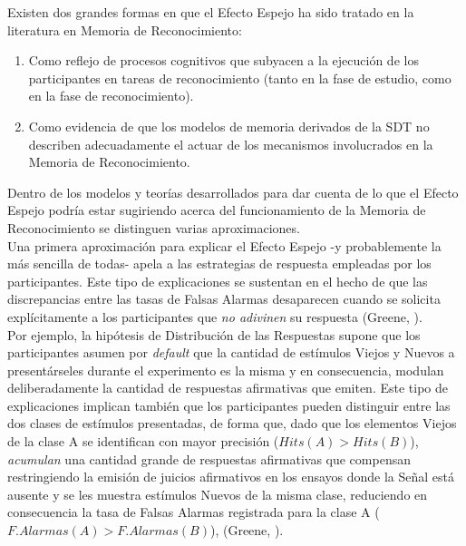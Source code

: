 Existen dos grandes formas en que el Efecto Espejo ha sido tratado en la literatura en Memoria de Reconocimiento:\\

\begin{enumerate}
\item Como reflejo de procesos cognitivos que subyacen a la ejecución de los participantes en tareas de reconocimiento (tanto en la fase de estudio, como en la fase de reconocimiento).\\

\item Como evidencia de que los modelos de memoria derivados de la SDT no describen adecuadamente el actuar de los mecanismos involucrados en la Memoria de Reconocimiento.\\
\end{enumerate}

Dentro de los modelos y teorías desarrollados para dar cuenta de lo que el Efecto Espejo podría estar sugiriendo acerca del funcionamiento de la Memoria de Reconocimiento se distinguen varias aproximaciones.\\

Una primera aproximación para explicar el Efecto Espejo -y probablemente la más sencilla de todas- apela a las estrategias de respuesta empleadas por los participantes. Este tipo de explicaciones se sustentan en el hecho de que las discrepancias entre las tasas de Falsas Alarmas desaparecen cuando se solicita explícitamente a los participantes que \textit{no adivinen} su respuesta (Greene, \citeyear{Greene1996}).\\

Por ejemplo, la hipótesis de Distribución de las Respuestas supone que los participantes asumen por \textit{default} que la cantidad de estímulos Viejos y Nuevos a presentárseles durante el experimento es la misma y en consecuencia, modulan deliberadamente la cantidad de respuestas afirmativas que emiten. Este tipo de explicaciones implican también que los participantes pueden distinguir entre las dos clases de estímulos presentadas, de forma que, dado que los elementos Viejos de la clase A se identifican con mayor precisión ($Hits(A) > Hits(B)$), \textit{acumulan} una cantidad grande de respuestas afirmativas que compensan restringiendo la emisión de juicios afirmativos en los ensayos donde la Señal está ausente y se les muestra estímulos Nuevos de la misma clase, reduciendo en consecuencia la tasa de Falsas Alarmas registrada para la clase A ($F.Alarmas(A) > F.Alarmas(B)$), (Greene, \citeyear{Greene1996}).\\

